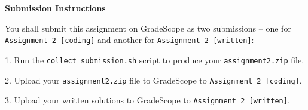 \Large{\textbf{Submission Instructions}}

\normalsize

You shall submit this assignment on GradeScope as two submissions – one for \texttt{Assignment 2 [coding]} and another for \texttt{Assignment 2 [written]}:

1. Run the \texttt{collect\_submission.sh} script to produce your \texttt{assignment2.zip} file.

2. Upload your \texttt{assignment2.zip} file to GradeScope to \texttt{Assignment 2 [coding]}.

3. Upload your written solutions to GradeScope to \texttt{Assignment 2 [written]}.
